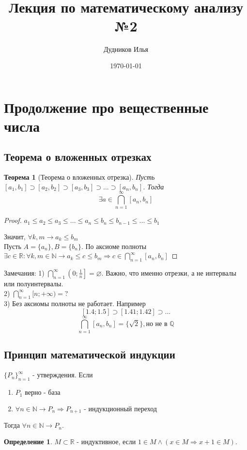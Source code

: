 \documentclass[12pt]{article}
\title{Лекция по математическому анализу №2}
\author{Дудников Илья}
\date{\today}
\newtheorem{theorem}{Теорема}
\theoremstyle{definition}
\newtheorem{definition}{Определение}
\begin{document}
    \maketitle
    \tableofcontents
    \section{Продолжение про вещественные числа}
    \subsection{Теорема о вложенных отрезках}
    
    \begin{theorem}[Теорема о вложенных отрезка]
        Пусть $[a_1, b_1] \supset [a_2, b_2] \supset [a_3, b_3] \supset ... \supset [a_n, b_n]$. Тогда $$\exists a \in \bigcap_{n = 1}^{\infty}[a_n, b_n]$$
    \end{theorem}

    \begin{proof}
        $a_1 \leqslant a_2 \leqslant a_3 \leqslant ... \leqslant a_n \leqslant b_n \leqslant b_{n - 1} \leqslant ... \leqslant b_1$
        
        Значит, $\forall k, m \to a_k \leqslant b_m$ \\
        Пусть $A = \{a_n\}, B = \{b_n\}$. По аксиоме полноты $\exists c \in \mathbb{R} : \forall k, m \in \mathbb{N} \to a_k \leqslant c \leqslant b_m \Rightarrow c \in \bigcap_{n = 1}^{\infty} [a_n, b_n]$  
    \end{proof}
    Замечания: 1) $\bigcap_{n = 1}^{\infty} \left(0; \frac{1}{n}\right] = \varnothing$. Важно, что именно отрезки, а не интервалы или полуинтервалы.  \\
    2) $\bigcap_{n = 1}^{\infty} [n; +\infty) = ?$ \\
    3) Без аксиомы полноты не работает. Например 
    \[[1.4; 1.5] \supset [1.41; 1.42] \supset ...\]
    \[\bigcap_{n = 1}^{\infty}[a_n, b_n] = \{\sqrt{2}\}, \text{но не в } \mathbb{Q}\]

    \subsection{Принцип математической индукции}
    $\{P_n\}_{n = 1}^{\infty}$ - утверждения. Если
    \begin{enumerate}
        \item $P_1$ верно - база
        \item $\forall n \in \mathbb{N} \to P_n \Rightarrow P_{n + 1}$ - индукционный переход  
    \end{enumerate}
    Тогда $\forall n \in \mathbb{N} \to P_n$.
    \begin{definition}
        $M \subset \mathbb{R}$ - индуктивное, если $1 \in M \wedge (x \in M \Rightarrow x + 1 \in M)$.  
    \end{definition} 
\end{document}
